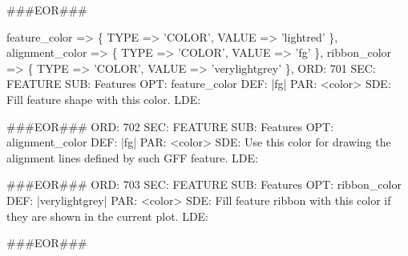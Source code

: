 \documentclass[11pt]{article}
\def\nwendcode{\endtrivlist \endgroup} %
\let\nwdocspar=\par                    %
\begin{document}
###EOR###
\nwendcode{}\nwdocspar

\nwenddocs{}\plusendmoddef
feature_color                => \{ TYPE => 'COLOR', VALUE => 'lightred'      \},
alignment_color              => \{ TYPE => 'COLOR', VALUE => 'fg'            \},
ribbon_color                 => \{ TYPE => 'COLOR', VALUE => 'verylightgrey' \},
\eatline
{}\nwendcode{}\plusendmoddef
ORD: 701
SEC: FEATURE
SUB: Features
OPT: feature_color
DEF: |fg|
PAR: <color>
SDE: Fill feature shape with this color.
LDE: 

###EOR###
ORD: 702
SEC: FEATURE
SUB: Features
OPT: alignment_color
DEF: |fg|
PAR: <color>
SDE: Use this color for drawing the alignment lines defined by such GFF feature.
LDE: 

###EOR###
ORD: 703
SEC: FEATURE
SUB: Features
OPT: ribbon_color
DEF: |verylightgrey|
PAR: <color>
SDE: Fill feature ribbon with this color if they are shown in the current plot.
LDE: 

###EOR###
\nwendcode{}\nwdocspar
\end{document}
